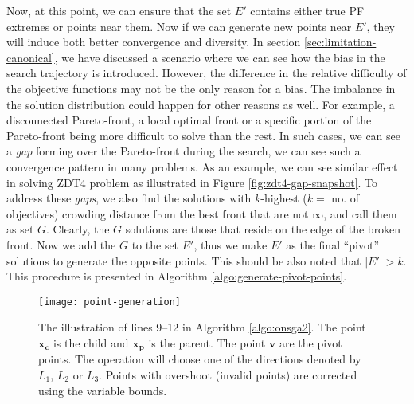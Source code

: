 \documentclass[journal]{IEEEtran}
\let\MYoriglatexcaption\caption
\renewcommand{\caption}[2][\relax]{\MYoriglatexcaption[#2]{#2}}
\begin{document}
Now, at this point, we can ensure that the set \(E'\) contains either true PF extremes or points near them. Now if we can generate new points near \(E'\), they will induce both better convergence and diversity. In section \ref{sec:limitation-canonical}, we have discussed a scenario where we can see how the bias in the search trajectory is introduced. However, the difference in the relative difficulty of the objective functions may not be the only reason for a bias. The imbalance in the solution distribution could happen for other reasons as well. For example, a disconnected Pareto-front, a local optimal front or a specific portion of the Pareto-front being more difficult to solve than the rest. In such cases, we can see a \textit{gap} forming over the Pareto-front during the search, we can see such a convergence pattern in many problems. As an example, we can see similar effect in solving ZDT4 problem as illustrated in Figure \ref{fig:zdt4-gap-snapshot}. To address these \textit{gaps}, we also find the solutions with \(k\)-highest (\(k = \) no. of objectives) crowding distance from the best front that are not \(\infty\), and call them as set \(G\). Clearly, the \(G\) solutions are those that reside on the edge of the broken front. Now we add the \(G\) to the set \(E'\), thus we make \(E'\) as the final ``pivot'' solutions to generate the opposite points. This should be also noted that \(|E'| > k\). This procedure is presented in Algorithm \ref{algo:generate-pivot-points}.

\begin{figure}[tp!]
\centering
\texttt{[image: point-generation]}
\caption{The illustration of lines 9--12 in Algorithm \ref{algo:onsga2}. The point \(\mathbf{x_c}\) is the child and \(\mathbf{x_p}\) is the parent. The point \(\mathbf{v}\) are the pivot points. The operation will choose one of the directions denoted by \(L_1\), \(L_2\) or \(L_3\). Points with overshoot (invalid points) are corrected using the variable bounds.}
\label{fig:opposite-creation}
\end{figure}
%
\end{document}
